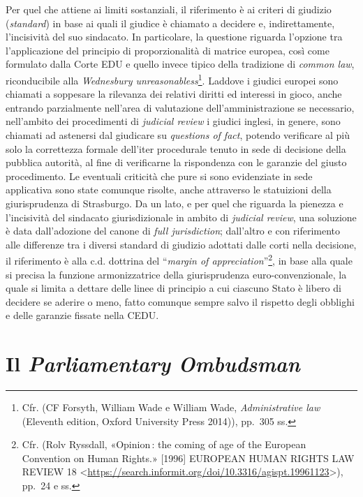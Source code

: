 \documentclass[12pt,it,a4paper,]{report}
\begin{document}
Per quel che attiene ai limiti sostanziali, il riferimento è ai criteri
di giudizio (\emph{standard}) in base ai quali il giudice è chiamato a
decidere e, indirettamente, l'incisività del suo sindacato. In
particolare, la questione riguarda l'opzione tra l'applicazione del
principio di proporzionalità di matrice europea, così come formulato
dalla Corte EDU e quello invece tipico della tradizione di \emph{common
law}, riconducibile alla \emph{Wednesbury unreasonabless}\footnote{Cfr.
  (CF Forsyth, William Wade e William Wade, \emph{Administrative law}
  (Eleventh edition, Oxford University Press 2014)), pp.~305 ss.}.
Laddove i giudici europei sono chiamati a soppesare la rilevanza dei
relativi diritti ed interessi in gioco, anche entrando parzialmente
nell'area di valutazione dell'amministrazione se necessario, nell'ambito
dei procedimenti di \emph{judicial review} i giudici inglesi, in genere,
sono chiamati ad astenersi dal giudicare su \emph{questions of fact},
potendo verificare al più solo la correttezza formale dell'iter
procedurale tenuto in sede di decisione della pubblica autorità, al fine
di verificarne la rispondenza con le garanzie del giusto procedimento.
Le eventuali criticità che pure si sono evidenziate in sede applicativa
sono state comunque risolte, anche attraverso le statuizioni della
giurisprudenza di Strasburgo. Da un lato, e per quel che riguarda la
pienezza e l'incisività del sindacato giurisdizionale in ambito di
\emph{judicial review}, una soluzione è data dall'adozione del canone di
\emph{full jurisdiction}; dall'altro e con riferimento alle differenze
tra i diversi standard di giudizio adottati dalle corti nella decisione,
il riferimento è alla c.d. dottrina del ``\emph{margin of
appreciation}''\footnote{Cfr. (Rolv Ryssdall, {«Opinion\,: the coming of
  age of the European Convention on Human Rights.»} {[}1996{]} EUROPEAN
  HUMAN RIGHTS LAW REVIEW 18
  \textless{}\url{https://search.informit.org/doi/10.3316/agispt.19961123}\textgreater{}),
  pp.~24 e ss.}, in base alla quale si precisa la funzione
armonizzatrice della giurisprudenza euro-convenzionale, la quale si
limita a dettare delle linee di principio a cui ciascuno Stato è libero
di decidere se aderire o meno, fatto comunque sempre salvo il rispetto
degli obblighi e delle garanzie fissate nella CEDU.

\hypertarget{il-parliamentary-ombudsman}{%
\section{\texorpdfstring{Il \emph{Parliamentary
Ombudsman}}{Il Parliamentary Ombudsman}}\label{il-parliamentary-ombudsman}}
\end{document}
